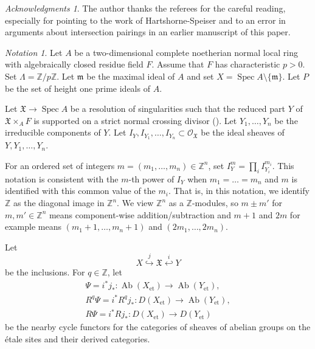 \documentclass{amsart}
\theoremstyle{remark}
\newtheorem*{Notation}{Notation}
\newtheorem*{Ack}{Acknowledgments}
\numberwithin{equation}{section}
\newcommand{\Order}{\mathcal{O}}
\newcommand{\into}{\hookrightarrow}
\newcommand{\intoback}{\hookleftarrow}
\newcommand{\Z}{\mathbb{Z}}
\newcommand{\et}{\mathrm{et}}
\newcommand{\ideal}[1]{\mathfrak{#1}}
\DeclareMathOperator{\Spec}{Spec}
\DeclareMathOperator{\Ab}{Ab}
\begin{document}
\begin{Ack}
	The author thanks the referees for the careful reading,
	especially for pointing to the work of Hartshorne-Speiser
	and to an error in arguments about intersection pairings
	in an earlier manuscript of this paper.
\end{Ack}

\begin{Notation}
	Let $A$ be a two-dimensional complete noetherian normal local ring
	with algebraically closed residue field $F$.
	Assume that $F$ has characteristic $p > 0$.
	Set $\Lambda = \Z / p \Z$.
	Let $\ideal{m}$ be the maximal ideal of $A$
	and set $X = \Spec A \setminus \{\ideal{m}\}$.
	Let $P$ be the set of height one prime ideals of $A$.
	
	Let $\mathfrak{X} \to \Spec A$ be a resolution of singularities
	such that the reduced part $Y$ of $\mathfrak{X} \times_{A} F$ is
	supported on a strict normal crossing divisor (\cite[Tag 0BIC]{Sta22}).
	Let $Y_{1}, \dots, Y_{n}$ be the irreducible components of $Y$.
	Let $I_{Y}, I_{Y_{1}}, \dots, I_{Y_{n}} \subset \Order_{\mathfrak{X}}$ be
	the ideal sheaves of $Y, Y_{1}, \dots, Y_{n}$.
	
	For an ordered set of integers $m = (m_{1}, \dots, m_{n}) \in \Z^{n}$,
	set $I_{Y}^{m} = \prod_{i} I_{Y_{i}}^{m_{i}}$.
	This notation is consistent with the $m$-th power of $I_{Y}$
	when $m_{1} = \dots = m_{n}$ and $m$ is identified with this common value of the $m_{i}$.
	That is, in this notation, we identify $\Z$ as the diagonal image in $\Z^{n}$.
	We view $\Z^{n}$ as a $\Z$-modules,
	so $m \pm m'$ for $m, m' \in \Z^{n}$ means component-wise addition/subtraction
	and $m + 1$ and $2 m$ for example means $(m_{1} + 1, \dots, m_{n} + 1)$
	and $(2 m_{1}, \dots, 2 m_{n})$.
	
	Let
		\[
			X \stackrel{j}{\into} \mathfrak{X} \stackrel{i}{\intoback} Y
		\]
	be the inclusions.
	For $q \in \Z$, let
		\begin{gather*}
					\Psi
				=
					i^{\ast} j_{\ast}
				\colon
					\Ab(X_{\et})
				\to
					\Ab(Y_{\et}),
			\\
					R^{q} \Psi
				=
					i^{\ast} R^{q} j_{\ast}
				\colon
					D(X_{\et})
				\to
					\Ab(Y_{\et}),
			\\
					R \Psi
				=
					i^{\ast} R j_{\ast}
				\colon
					D(X_{\et})
				\to
					D(Y_{\et})
		\end{gather*}
	be the nearby cycle functors
	for the categories of sheaves of abelian groups on the \'etale sites
	and their derived categories.
\end{Notation}
\end{document}
